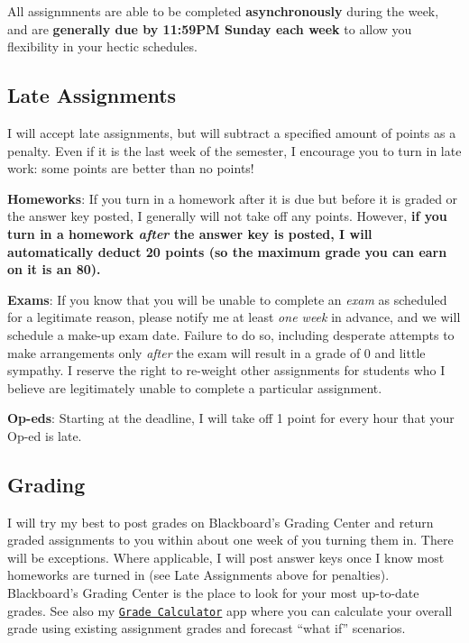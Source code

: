 \documentclass{article}
\begin{document}
All assignmnents are able to be completed \textbf{asynchronously} during
the week, and are \textbf{generally due by 11:59PM Sunday each week} to
allow you flexibility in your hectic schedules.

\hypertarget{late-assignments}{%
\subsection*{Late Assignments}\label{late-assignments}}

I will accept late assignments, but will subtract a specified amount of
points as a penalty. Even if it is the last week of the semester, I
encourage you to turn in late work: some points are better than no
points!

\textbf{Homeworks}: If you turn in a homework after it is due but before
it is graded or the answer key posted, I generally will not take off any
points. However, \textbf{if you turn in a homework \emph{after} the
answer key is posted, I will automatically deduct 20 points (so the
maximum grade you can earn on it is an 80).}

\textbf{Exams}: If you know that you will be unable to complete an
\emph{exam} as scheduled for a legitimate reason, please notify me at
least \emph{one week} in advance, and we will schedule a make-up exam
date. Failure to do so, including desperate attempts to make
arrangements only \emph{after} the exam will result in a grade of 0 and
little sympathy. I reserve the right to re-weight other assignments for
students who I believe are legitimately unable to complete a particular
assignment.

\textbf{Op-eds}: Starting at the deadline, I will take off 1 point for
every hour that your Op-ed is late.

\hypertarget{grading}{%
\subsection*{Grading}\label{grading}}

I will try my best to post grades on Blackboard's Grading Center and
return graded assignments to you within about one week of you turning
them in. There will be exceptions. Where applicable, I will post answer
keys once I know most homeworks are turned in (see Late Assignments
above for penalties). Blackboard's Grading Center is the place to look
for your most up-to-date grades. See also my
\href{https://ryansafner.shinyapps.io/306_grade_calculator/}{
\texttt{Grade\ Calculator}} app where you can calculate your overall
grade using existing assignment grades and forecast ``what if''
scenarios.
\end{document}
